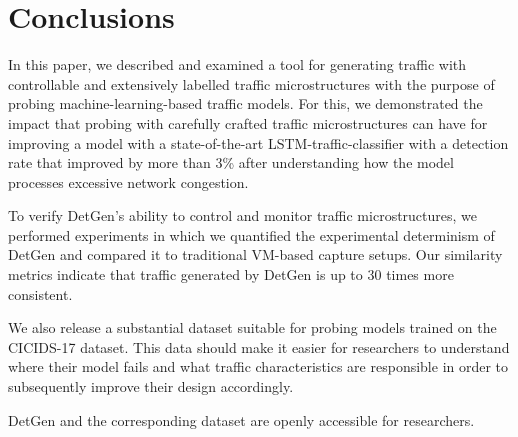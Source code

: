 \documentclass[runningheads]{llncs}
\begin{document}





\section{Conclusions}\label{Sec:Conclusion}

In this paper, we described and examined a tool for generating traffic with controllable and extensively labelled traffic microstructures with the purpose of probing machine-learning-based traffic models. For this, we demonstrated the impact that probing with carefully crafted traffic microstructures can have for improving a model with a state-of-the-art LSTM-traffic-classifier with a detection rate that improved by more than 3\% after understanding how the model processes excessive network congestion. 

To verify DetGen's ability to control and monitor traffic microstructures, we performed experiments in which we quantified the experimental determinism of DetGen and compared it to traditional VM-based capture setups. Our similarity metrics indicate that traffic generated by DetGen is up to 30 times more consistent.

We also release a substantial dataset suitable for probing models trained on the CICIDS-17 dataset. This data should make it easier for researchers to understand where their model fails and what traffic characteristics are responsible in order to subsequently improve their design accordingly.

DetGen and the corresponding dataset are openly accessible for researchers.


\end{document}
